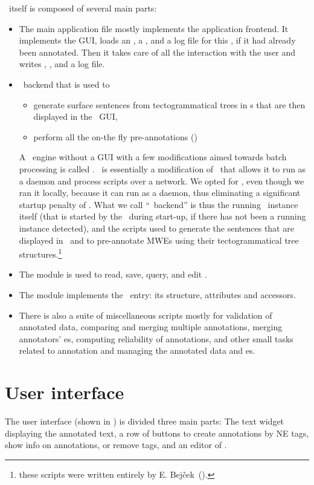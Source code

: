 \seman\ itself is composed of several main parts:
\begin{itemize}
  \item The main application file  mostly implements the application frontend. It implements the GUI, loads an \sf, a \semlex,  and a log file for this \sf, if it had already been annotated. Then it takes care of all the interaction with the user and writes \sf, \semlex, and a log file.
  \item \ntred\ backend that is used to 
	\begin{itemize}
	  \item generate surface sentences from tectogrammatical trees in \tf{}s that are then displayed in the \seman\ GUI,
	  \item perform all the on-the fly pre-annotations ()
	\end{itemize}
A \tred\ engine without a GUI with a few modifications aimed towards batch processing is called \btred. \ntred\ is essentially a modification of \btred\ that allows it to run as a daemon and process scripts over a network. We opted for \ntred, even though we ran it locally, because it can run as a daemon, thus eliminating a significant startup penalty of \btred. What we call ``\ntred\ backend'' is thus the running \ntred\ instance itself (that is started by the \seman\ during start-up, if there has not been a running instance detected), and the scripts used to generate the sentences that are displayed in \seman\ and to pre-annotate MWEs using their tectogrammatical tree structures.\footnote{these scripts were written entirely by E. Bejček~(\citeyear{bejcek:2010}).}
  \item The module  is used to read, save, query, and edit \semlex.
    \item The module  implements the \semlex\ entry: its structure, attributes and accessors.
  \item There is also a suite of miscellaneous scripts mostly for validation of annotated data, comparing and merging multiple annotations, merging annotators' \semlex{}es, computing reliability of annotations, and other small tasks related to annotation and managing the annotated data and \semlex{}es.
\end{itemize}

\section{User interface}
\label{sec:seman:gui}
The user interface (shown in ) is divided three main parts: The text widget displaying the annotated text, a row of buttons to create annotations by NE tags, show info on annotations, or remove tags, and an editor of \semlex. 



